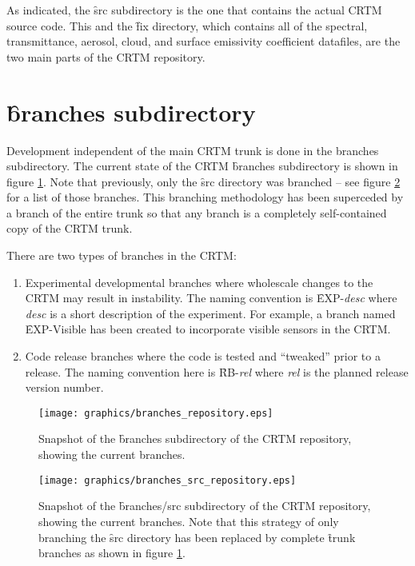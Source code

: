 As indicated, the \f{src} subdirectory is the one that contains the actual CRTM source code. This and the \f{fix} directory, which contains all of the spectral, transmittance, aerosol, cloud, and surface emissivity coefficient datafiles, are the two main parts of the CRTM repository.


\section{\f{branches} subdirectory}
Development independent of the main CRTM trunk is done in the branches subdirectory. The current state of the CRTM \f{branches} subdirectory is shown in figure \ref{fig:branches_repository}. Note that previously, only the \f{src} directory was branched -- see figure \ref{fig:branches_src_repository} for a list of those branches. This branching methodology has been superceded by a branch of the entire trunk so that any branch is a completely self-contained copy of the CRTM trunk.

There are two types of branches in the CRTM:
\begin{enumerate}
  \item Experimental developmental branches where wholescale changes to the CRTM may result in instability. The naming convention is \f{EXP-}\textit{desc} where \textit{desc} is a short description of the experiment. For example, a branch named \f{EXP-Visible} has been created to incorporate visible sensors in the CRTM. 
  \item Code release branches where the code is tested and ``tweaked'' prior to a release. The naming convention here is \f{RB-}\textit{rel} where \textit{rel} is the planned release version number.
\end{enumerate}

\begin{figure}[htb]
  \centering
  \texttt{[image: graphics/branches\_repository.eps]}
  \caption{Snapshot of the \f{branches} subdirectory of the CRTM repository, showing the current branches.}
  \label{fig:branches_repository}
\end{figure}


\begin{figure}[htb]
  \centering
  \texttt{[image: graphics/branches\_src\_repository.eps]}
  \caption{Snapshot of the \f{branches/src} subdirectory of the CRTM repository, showing the current branches. Note that this strategy of only branching the \f{src} directory has been replaced by complete \f{trunk} branches as shown in figure \ref{fig:branches_repository}.}
  \label{fig:branches_src_repository}
\end{figure}



